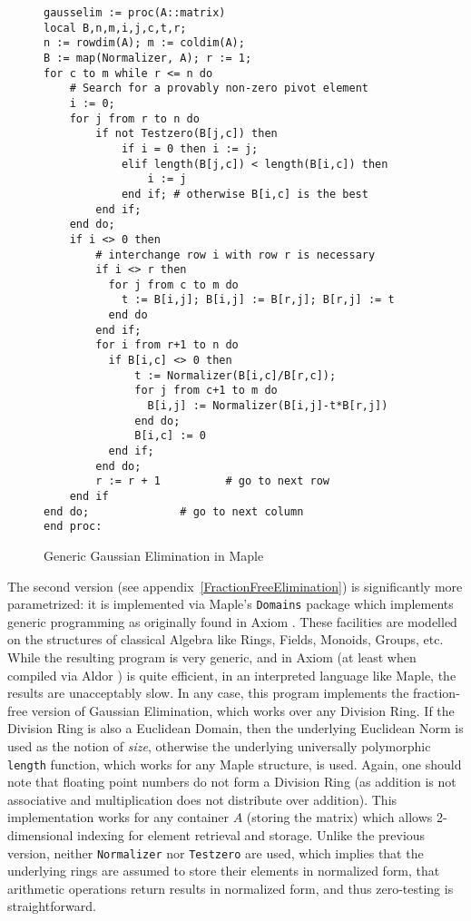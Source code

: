 \documentclass[11pt]{elsart}
\begin{document}
\begin{figure}
    \begin{small}
\begin{verbatim}
gausselim := proc(A::matrix)
local B,n,m,i,j,c,t,r;
n := rowdim(A); m := coldim(A);
B := map(Normalizer, A); r := 1;
for c to m while r <= n do
    # Search for a provably non-zero pivot element
    i := 0;
    for j from r to n do
        if not Testzero(B[j,c]) then
            if i = 0 then i := j;
            elif length(B[j,c]) < length(B[i,c]) then 
                i := j
            end if; # otherwise B[i,c] is the best
        end if;
    end do;
    if i <> 0 then
        # interchange row i with row r is necessary
        if i <> r then
          for j from c to m do 
            t := B[i,j]; B[i,j] := B[r,j]; B[r,j] := t
          end do
        end if;
        for i from r+1 to n do
          if B[i,c] <> 0 then 
              t := Normalizer(B[i,c]/B[r,c]);
              for j from c+1 to m do 
                B[i,j] := Normalizer(B[i,j]-t*B[r,j]) 
              end do;
              B[i,c] := 0
          end if;
        end do;
        r := r + 1          # go to next row
    end if
end do;              # go to next column
end proc:
\end{verbatim}
\end{small}
\caption{Generic Gaussian Elimination in Maple}
\label{gausselim}
\end{figure}

The second version (see appendix~\ref{FractionFreeElimination}) is
significantly more parametrized: it is implemented via Maple's \texttt{Domains}
package which implements generic programming as originally found in 
Axiom \cite{Jenks:1992:ASC}.  These facilities are modelled on the structures
of classical Algebra like Rings, Fields, Monoids, Groups, etc.  While
the resulting program is very generic, and in Axiom (at least when compiled 
via Aldor \cite{Watt:2002:HCA})
is quite efficient, in an interpreted language like Maple, the results
are unacceptably slow.  In any case, this program implements the fraction-free
version of Gaussian Elimination, which works over any Division Ring.
If the Division Ring is also a Euclidean Domain, then the underlying
Euclidean Norm is used as the notion of \emph{size}, otherwise the 
underlying universally polymorphic \texttt{length} function, which works
for any Maple structure, is used.  Again, one should note that floating
point numbers do not form a Division Ring (as addition is not associative
and multiplication does not distribute over addition).  This implementation
works for any container $A$ (storing the matrix) which allows 2-dimensional
indexing for element retrieval and storage.  Unlike the previous version, 
neither \texttt{Normalizer} nor \texttt{Testzero} are used, which implies
that the underlying rings are assumed to store their elements in 
normalized form, that arithmetic operations return results in normalized
form, and thus zero-testing is straightforward.
\end{document}
